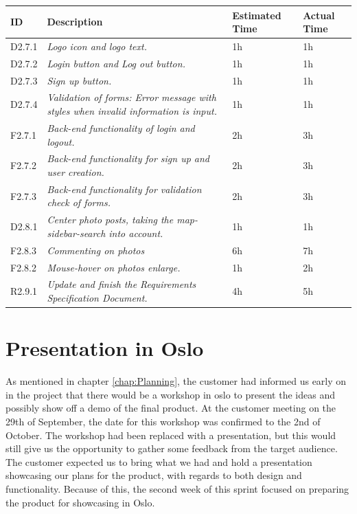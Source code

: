 \begin{minipage}{\linewidth}
\setlength{\tabcolsep}{12pt}
\centering
{}
\begin{tabular}{|p{1cm}|p{4cm}|p{2cm}|p{2cm}|}
\hline
\cellcolor{gray!25} ID & \cellcolor{gray!25} Description & \cellcolor{gray!25} Estimated Time & \cellcolor{gray!25} Actual Time \\
\hline
D2.7.1 & \it{Logo icon and logo text.} & 1h & 1h \\
D2.7.2 & \it{Login button and Log out button.} & 1h & 1h \\
D2.7.3 & \it{Sign up button.} & 1h & 1h \\
D2.7.4 & \it{Validation of forms: Error message with styles when invalid information is input.} & 1h & 1h \\
F2.7.1 & \it{Back-end functionality of login and logout.} & 2h & 3h \\
F2.7.2 & \it{Back-end functionality for sign up and user creation.} & 2h & 3h \\
F2.7.3 & \it{Back-end functionality for validation check of forms.} & 2h & 3h \\
D2.8.1 & \it{Center photo posts, taking the map-sidebar-search into account.} & 1h & 1h \\
F2.8.3 & \it{Commenting on photos} & 6h & 7h \\
F2.8.2 & \it{Mouse-hover on photos enlarge.} & 1h & 2h \\
R2.9.1 & \it{Update and finish the Requirements Specification Document.} & 4h & 5h \\
\hline
\end{tabular}
\end{minipage}

\section{Presentation in Oslo}
\label{sec:S2Presentation}

As mentioned in chapter \ref{chap:Planning}, the customer had informed us early on in the project that there would be a workshop in oslo to present the ideas and possibly show off a demo of the final product. At the customer meeting on the 29th of September, the date for this workshop was confirmed to the 2nd of October. The workshop had been replaced with a presentation, but this would still give us the opportunity to gather some feedback from the target audience. The customer expected us to bring what we had and hold a presentation showcasing our plans for the product, with regards to both design and functionality. Because of this, the second week of this sprint focused on preparing the product for showcasing in Oslo.

